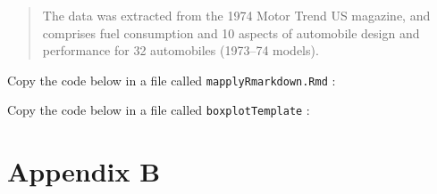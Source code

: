 \documentclass[]{book}
\theoremstyle{definition}
\theoremstyle{definition}
\theoremstyle{definition}
\theoremstyle{remark}
\begin{document}
\begin{quote}
The data was extracted from the 1974 Motor Trend US magazine, and
comprises fuel consumption and 10 aspects of automobile design and
performance for 32 automobiles (1973--74 models).
\end{quote}

Copy the code below in a file called \texttt{mapplyRmarkdown.Rmd} :

Copy the code below in a file called \texttt{boxplotTemplate} :

\chapter{Appendix B}\label{appendix-b}


\end{document}
